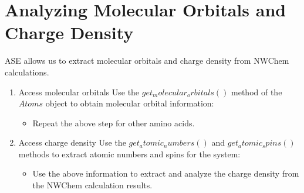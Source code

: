 \documentclass[letterpaper,10pt,english]{sphinxmanual}
\begin{document}
\section{Analyzing Molecular Orbitals and Charge Density}
\label{\detokenize{nwase/nwase:analyzing-molecular-orbitals-and-charge-density}}
\sphinxAtStartPar
ASE allows us to extract molecular orbitals and charge density from NWChem calculations.
\begin{enumerate}
%
\item {} 
\sphinxAtStartPar
Access molecular orbitals
\sphinxhyphen{} Use the \(get_molecular_orbitals()\) method of the \(Atoms\) object to obtain molecular orbital information:
\begin{quote}

\begin{sphinxVerbatim}[commandchars=\\\{\}]
    

\end{sphinxVerbatim}
\end{quote}
\begin{itemize}
\item {} 
\sphinxAtStartPar
Repeat the above step for other amino acids.

\end{itemize}

\item {} 
\sphinxAtStartPar
Access charge density
\sphinxhyphen{} Use the \(get_atomic_numbers()\) and \(get_atomic_spins()\) methods to extract atomic numbers and spins for the system:
\begin{quote}

\begin{sphinxVerbatim}[commandchars=\\\{\}]
  
  
\end{sphinxVerbatim}
\end{quote}
\begin{itemize}
\item {} 
\sphinxAtStartPar
Use the above information to extract and analyze the charge density from the NWChem calculation results.

\end{itemize}

\end{enumerate}
\end{document}
